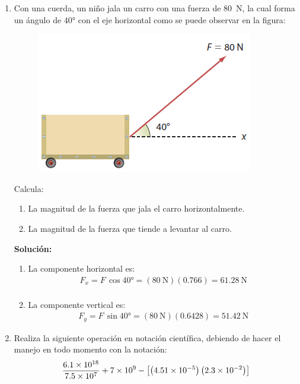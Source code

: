 \documentclass[14pt]{extarticle}
\begin{document}
\begin{enumerate}
\begin{enumerate}
\begin{figure}[H]
\end{figure}

\end{enumerate}
\item Con una cuerda, un niño jala un carro con una fuerza de \SI{80}{\newton}, la cual forma un ángulo de $\ang{40}$ con el eje horizontal como se puede observar en la figura:
\begin{figure}[H]
     \centering
     \includegraphics[scale=1]{Imagenes/Ejercicio_Opcional_01.png}
\end{figure}
Calcula:
\begin{enumerate}[label=\alph*)]
\item La magnitud de la fuerza que jala el carro horizontalmente.
\item La magnitud de la fuerza que tiende a levantar al carro.
\end{enumerate}
\textbf{Solución:}
\begin{enumerate}
\item La componente horizontal es:
\begin{align*}
F_{x} = F \, \cos \ang{40} = (\SI{80}{\newton})(0.766) = \SI{61.28}{\newton} \\[0.5em]
\end{align*}
\item La componente vertical es:
\begin{align*}
F_{y} = F \, \sin \ang{40} = (\SI{80}{\newton})(0.6428) = \SI{51.42}{\newton}
\end{align*}
\end{enumerate}

\item Realiza la siguiente operación en notación científica, debiendo de hacer el manejo en todo momento con la notación:
\begin{align*}
\dfrac{\num{6.1d18}}{\num{7.5d7}} + \num{7d9} - \left[ \left( \num{4.51d-5} \right) \left( \num{2.3d-2} \right)\right]
\end{align*}


\end{enumerate}
\end{document}
